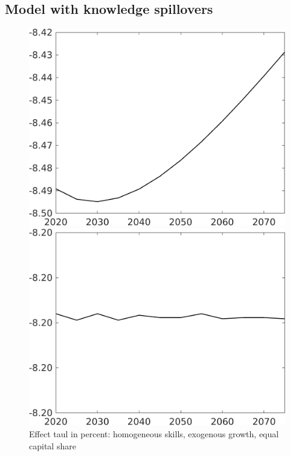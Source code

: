 \documentclass[12pt]{article}
\begin{document}
\subsection{Model with knowledge spillovers}
\begin{figure}[h!!]
	\centering
	\caption{Effect taul in percent: homogeneous skills, exogenous growth, equal capital share}\label{fig:LF_BAU_nsk1_xgr1_equalcapShare_know}
	\begin{minipage}[]{0.32\textwidth}
		\includegraphics[width=1\textwidth]{../../codding_model/own_basedOnFried/optimalPol_010922_revision/figures/all_13Sept22/CompTaul_Equlab_LFBAUPer_Reg0_Emnet_spillover0_nsk1_xgr1_knspil0_sep1_countec0_GovRev0_etaa0.79.png}
	\end{minipage}	
	\begin{minipage}[]{0.32\textwidth}
		\includegraphics[width=1\textwidth]{../../codding_model/own_basedOnFried/optimalPol_010922_revision/figures/all_13Sept22/CompTaul_Equlab_LFBAUPer_Reg0_hh_spillover0_nsk1_xgr1_knspil0_sep1_countec0_GovRev0_etaa0.79.png}

\end{minipage}
\end{figure}
\end{document}
